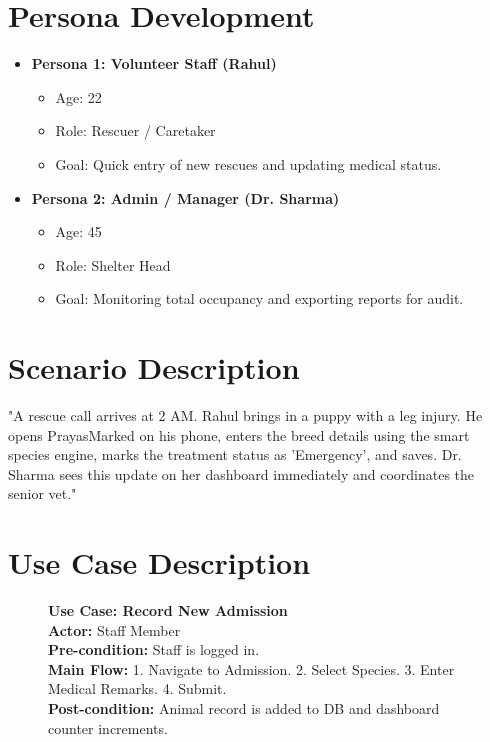\documentclass[12pt,a4paper]{report}
\begin{document}
\section{Persona Development}
\begin{itemize}[label=--]
    \item \textbf{Persona 1: Volunteer Staff (Rahul)}
    \begin{itemize}
        \item Age: 22
        \item Role: Rescuer / Caretaker
        \item Goal: Quick entry of new rescues and updating medical status.
    \end{itemize}
    \item \textbf{Persona 2: Admin / Manager (Dr. Sharma)}
    \begin{itemize}
        \item Age: 45
        \item Role: Shelter Head
        \item Goal: Monitoring total occupancy and exporting reports for audit.
    \end{itemize}
\end{itemize}

\section{Scenario Description}
"A rescue call arrives at 2 AM. Rahul brings in a puppy with a leg injury. He opens PrayasMarked on his phone, enters the breed details using the smart species engine, marks the treatment status as 'Emergency', and saves. Dr. Sharma sees this update on her dashboard immediately and coordinates the senior vet."

\section{Use Case Description}
\begin{figure}[H]
    \centering
    \begin{mdframed}[linecolor=primary]
        \textbf{Use Case: Record New Admission} \\
        \textbf{Actor:} Staff Member \\
        \textbf{Pre-condition:} Staff is logged in. \\
        \textbf{Main Flow:} 1. Navigate to Admission. 2. Select Species. 3. Enter Medical Remarks. 4. Submit. \\
        \textbf{Post-condition:} Animal record is added to DB and dashboard counter increments.
    \end{mdframed}
\end{figure}
\end{document}
